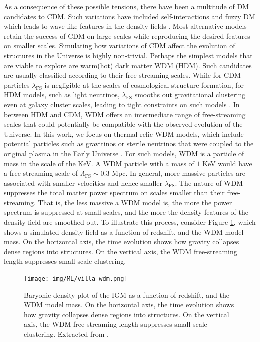As a consequence of these possible tensions, there have been a multitude of DM candidates to CDM. Such variations have included self-interactions \cite{Spergel2000} and fuzzy DM which leads to wave-like features in the density fields \cite{Hu2000}. Most alternative models retain the success of CDM on large scales while reproducing the desired features on smaller scales. Simulating how variations of CDM affect the evolution of structures in the Universe is highly non-trivial. Perhaps the simplest models that are viable to explore are warm(hot) dark matter WDM (HDM). Such candidates are usually classified according to their free-streaming scales. While for CDM particles $\lambda_\mathrm{FS}$ is negligible at the scales of cosmological structure formation, for HDM models, such as light neutrinos, $\lambda_\mathrm{FS}$ smooths out gravitational clustering even at galaxy cluster scales, leading to tight constraints on such models \cite{Hannestad_2004}. In between HDM and CDM, WDM offers an intermediate range of free-streaming scales that could potentially be compatible with the observed evolution of the Universe. In this work, we focus on thermal relic WDM models, which include potential particles such as gravitinos or sterile neutrinos that were coupled to the original plasma in the Early Universe \cite{Viel_2005}. For such models, WDM is a particle of mass in the scale of the KeV. A WDM particle with a mass of $1$ KeV would have a free-streaming scale of $\Lambda_\mathrm{FS} \sim 0.3$ Mpc. In general, more massive particles are associated with smaller velocities and hence smaller $\lambda_\mathrm{FS}$. The nature of WDM suppresses the total matter power spectrum on scales smaller than their free-streaming. That is, the less massive a WDM model is, the more the power spectrum is suppressed at small scales, and the more the density features of the density field are smoothed out.
To illustrate this process, consider Figure \ref{fig:villasenor_wdm}, which shows a simulated density field as a function of redshift, and the WDM model mass. On the horizontal axis, the time evolution shows how gravity collapses dense regions into structures. On the vertical axis, the WDM free-streaming length suppresses small-scale clustering. 

\begin{figure}[ht]
    \centering
    \texttt{[image: img/ML/villa\_wdm.png]}
    \caption{Baryonic density plot of the IGM as a function of redshift, and the WDM model mass. On the horizontal axis, the time evolution shows how gravity collapses dense regions into structures. On the vertical axis, the WDM free-streaming length suppresses small-scale clustering. Extracted from \cite{Villasenor_2023}.}
    \label{fig:villasenor_wdm}
\end{figure}

